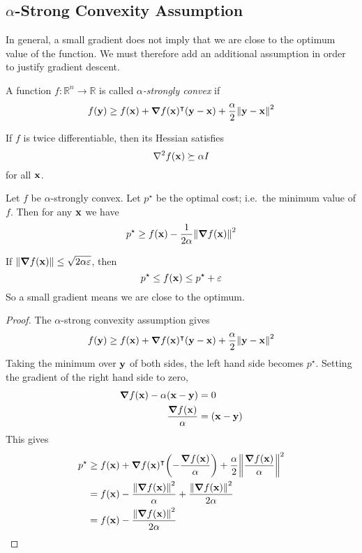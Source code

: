 \subsection{\(\alpha\)-Strong Convexity Assumption}
In general, a small gradient does not imply that we are close to the optimum value of the function.
We must therefore add an additional assumption in order to justify gradient descent.
\begin{definition}
	A function \(f \colon \mathbb R^n \to \mathbb R\) is called \textit{\(\alpha\)-strongly convex} if
	\[
		f(\vb y) \geq f(\vb x) + \grad{f(\vb x)}^\intercal (\vb y - \vb x) + \frac{\alpha}{2}\norm{\vb y - \vb x}^2
	\]
\end{definition}
\noindent If \(f\) is twice differentiable, then its Hessian satisfies
\[
	\laplacian{f(\vb x)} \succeq \alpha I
\]
for all \(\vb x\).
\begin{claim}
	Let \(f\) be \(\alpha\)-strongly convex.
	Let \(p^\star\) be the optimal cost; i.e.\ the minimum value of \(f\).
	Then for any \(\vb x\) we have
	\[
		p^\star \geq f(\vb x) - \frac{1}{2\alpha}\norm{\grad{f(\vb x)}}^2
	\]
\end{claim}
\begin{remark}
	If \(\norm{\grad{f(\vb x)}} \leq \sqrt{2\alpha\varepsilon}\), then
	\[
		p^\star \leq f(\vb x) \leq p^\star + \varepsilon
	\]
	So a small gradient means we are close to the optimum.
\end{remark}
\begin{proof}
	The \(\alpha\)-strong convexity assumption gives
	\[
		f(\vb y) \geq f(\vb x) + \grad{f(\vb x)}^\intercal (\vb y - \vb x) + \frac{\alpha}{2}\norm{\vb y - \vb x}^2
	\]
	Taking the minimum over \(\vb y\) of both sides, the left hand side becomes \(p^\star\).
	Setting the gradient of the right hand side to zero,
	\begin{align*}
		\grad{f(\vb x)} - \alpha (\vb x - \vb y) & = 0               \\
		\frac{\grad{f(\vb x)}}{\alpha}           & = (\vb x - \vb y) \\
	\end{align*}
	This gives
	\begin{align*}
		p^\star & \geq f(\vb x) + \grad{f(\vb x)}^\intercal \qty(-\frac{\grad{f(\vb x)}}{\alpha}) + \frac{\alpha}{2}\norm{\frac{\grad{f(\vb x)}}{\alpha}}^2 \\
		        & = f(\vb x) - \frac{\norm{\grad{f(\vb x)}}^2}{\alpha} + \frac{\norm{\grad{f(\vb x)}}^2}{2\alpha}                                            \\
		        & = f(\vb x) - \frac{\norm{\grad{f(\vb x)}}^2}{2\alpha}
	\end{align*}
\end{proof}
